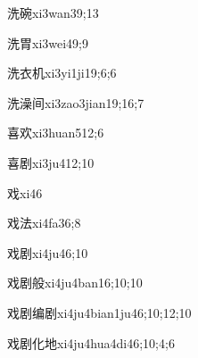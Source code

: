 \begin{verbete}{洗碗}{xi3wan3}{9;13}
\end{verbete}

\begin{verbete}{洗胃}{xi3wei4}{9;9}
\end{verbete}

\begin{verbete}{洗衣机}{xi3yi1ji1}{9;6;6}
\end{verbete}

\begin{verbete}{洗澡间}{xi3zao3jian1}{9;16;7}
\end{verbete}

\begin{verbete}{喜欢}{xi3huan5}{12;6}
\end{verbete}

\begin{verbete}{喜剧}{xi3ju4}{12;10}
\end{verbete}

\begin{verbete}{戏}{xi4}{6}
\end{verbete}

\begin{verbete}{戏法}{xi4fa3}{6;8}
\end{verbete}

\begin{verbete}{戏剧}{xi4ju4}{6;10}
\end{verbete}

\begin{verbete}{戏剧般}{xi4ju4ban1}{6;10;10}
\end{verbete}

\begin{verbete}{戏剧编剧}{xi4ju4bian1ju4}{6;10;12;10}
\end{verbete}

\begin{verbete}{戏剧化地}{xi4ju4hua4di4}{6;10;4;6}
\end{verbete}

